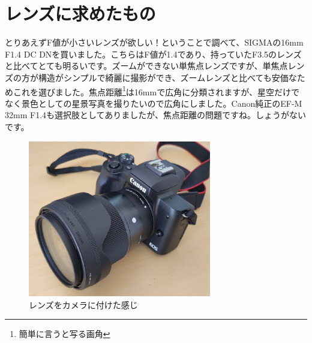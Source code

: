 \documentclass[a4paper.10pt]{jarticle}
\begin{document}
\section{レンズに求めたもの}
とりあえずF値が小さいレンズが欲しい！ということで調べて、SIGMAの16mm F1.4 DC DNを買いました。こちらはF値が1.4であり、持っていたF3.5のレンズと比べてとても明るいです。ズームができない単焦点レンズですが、単焦点レンズの方が構造がシンプルで綺麗に撮影ができ、ズームレンズと比べても安価なためこれを選びました。焦点距離\footnote{簡単に言うと写る画角}は16mmで広角に分類されますが、星空だけでなく景色としての星景写真を撮りたいので広角にしました。Canon純正のEF-M 32mm F1.4も選択肢としてありましたが、焦点距離の問題ですね。しょうがないです。
\begin{figure}
\begin{center}
  \includegraphics[width=8cm]{don.jpg}
\caption{レンズをカメラに付けた感じ}
\label{}
\end{center}
\end{figure}
\end{document}
